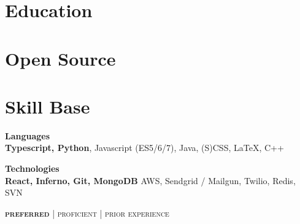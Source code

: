 \documentclass{article}
\begin{document}
\begin{minipage}[t]{0.38\textwidth}
  \vspace{0pt}

  \section{Education}

    

    

  \section{Open Source}

    

    

    

  \section{Skill Base}
  {\raggedright
    \textbf{Languages} \\
    {\small
      {\color{highlight}
        \textbf{Typescript, Python},  Javascript (ES5/6/7), Java, (S)CSS,
      }
      LaTeX, C++
    }

    \vspace{5pt}

    \textbf{Technologies} \\
    {\small
      {\color{highlight}\textbf{
        React, Inferno, Git, MongoDB
      }}
      {\color{highlight}
        AWS, Sendgrid / Mailgun, Twilio,
      }
      Redis, SVN
    }

    \hfill\textsc{\footnotesize{\textbf{preferred} | {\color{highlight} proficient} | prior experience}}
  }
\end{minipage}
\end{document}
